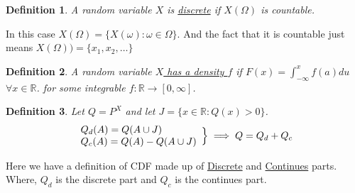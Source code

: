 \documentclass{article}
\newtheorem{definition}{Definition}
\newcommand{\R}{ \mathbb{R} }
\begin{document}
\begin{definition}
    A random variable $X$ is \underline{discrete} if $X(\Omega)$ is countable.
\end{definition}
In this case $X(\Omega) = \{X(\omega) : \omega \in \Omega\} $. And the fact that it is 
countable just means $X(\Omega)) = \{ x_1, x_2, \ldots \} $

\begin{definition}
    A random variable \underline{$X$ has a density $f$}  if 
    $F(x) = \int_{-\infty}^{x} f(a) du$ $\forall x \in \R$. 
    for some integrable $f : \R \to  [0, \infty]$.
\end{definition}

\begin{definition}
   Let $Q = P^X$ and let $J = \{ x \in  \R : Q(x) > 0\}$. 
   \begin{align*}
       \begin{array}{l}
           Q_d(A) = Q(A \cup J) \cr
           Q_c(A) = Q(A) - Q(A \cup J)
       \end{array}
       \Bigr\} \implies Q = Q_d + Q_c
   \end{align*}
\end{definition}
Here we have a definition of CDF made up of \underline{Discrete} and \underline{Continues} 
parts. Where, $Q_d$ is the discrete part and  $Q_c$ is the continues part.
\end{document}

